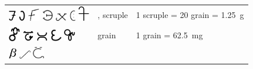 \documentclass[british,final,landscape]{scrartcl}
\begin{document}
\begin{refsection}
\begin{supertabular}{p{0.3\textwidth}p{0.34\textwidth}p{0.34\textwidth}}
   \includegraphics[height=5mm]{Measures/Scruple}  \includegraphics[height=5mm]{Measures/Scruple2} \includegraphics[width=5mm]{Measures/Scruple3} \includegraphics[width=5mm]{Measures/Scruple4} \includegraphics[width=5mm]{Measures/Scruple5} \includegraphics[height=5mm]{Measures/Scruple6} \includegraphics[width=5mm]{Measures/Scruple7} & , scruple & 1 scruple = 20 grain = \SI{1.25}{g} \\
   \includegraphics[width=5mm]{Measures/Grain}  \includegraphics[width=5mm]{Measures/Grain2} \includegraphics[width=5mm]{Measures/Grain3} \includegraphics[width=5mm]{Measures/Grain4} \includegraphics[width=5mm]{Measures/Grain5} & grain & 1 grain = \SI{62.5}{mg} \\
   \includegraphics[height=5mm]{Measures/Half} \includegraphics[width=5mm]{Measures/Half2} \includegraphics[width=5mm]{Measures/Half3} & & \\

\end{supertabular}
\end{refsection}
\end{document}
